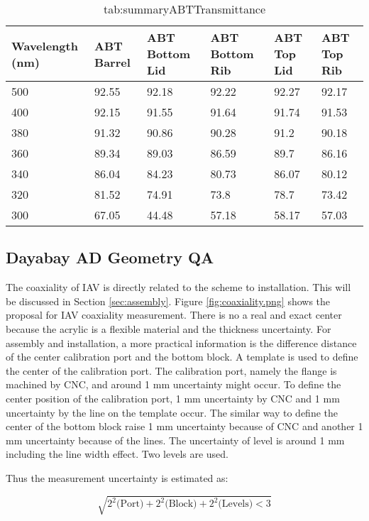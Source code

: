 \begin{table}
\centering
\caption{tab:summaryABTTransmittance}
\label{tab:}
\begin{tabular}{lp{1.5cm}p{1.5cm}p{1.5cm}p{1.5cm}p{1.5cm}}
\hline
Wavelength (nm) & ABT Barrel  & ABT Bottom Lid & ABT Bottom Rib &  ABT Top Lid &  ABT Top Rib \\
\hline
\hline
500 & 92.55 &  92.18 &  92.22 &  92.27 &  92.17\\
400 & 92.15 &  91.55 &  91.64 &  91.74 &  91.53\\
380 & 91.32 &  90.86 &  90.28 &  91.2  &  90.18\\
360 & 89.34 &  89.03 &  86.59 &  89.7  &  86.16\\
340 & 86.04 &  84.23 &  80.73 &  86.07 &  80.12\\
320 & 81.52 &  74.91 &  73.8  &  78.7  &  73.42\\
300 & 67.05 &  44.48 &  57.18 &  58.17 &  57.03\\
\end{tabular}
\end{table}


\subsection {Dayabay AD Geometry QA}


The coaxiality of IAV is directly related to the scheme to installation.
This will be discussed in Section \ref{sec:assembly}.
Figure \ref{fig:coaxiality.png} shows the proposal for IAV coaxiality measurement.
There is no a real and exact center because the acrylic is a flexible material and
the thickness uncertainty. For assembly and installation, a more practical information is the difference
distance of the center calibration port and the bottom block.
A template is used to define the center of the calibration port.
The calibration port, namely the flange is machined by CNC, and around 1 mm uncertainty might occur.
To define the center position of the calibration port,
1 mm uncertainty by CNC and 1 mm uncertainty by the line on the template occur.
The similar way to define the center of the bottom block raise 1 mm uncertainty because of CNC and
another 1 mm uncertainty because of the lines.
The uncertainty of level is around 1 mm including the line width effect.
Two levels are used.

Thus the measurement uncertainty is estimated as:


\begin{equation}
\label{equ:coaxiality}
\sqrt{
2^2\mbox{(Port)} +
2^2\mbox{(Block)} +
2^2\mbox{(Levels)} < 3
}
\end{equation}


